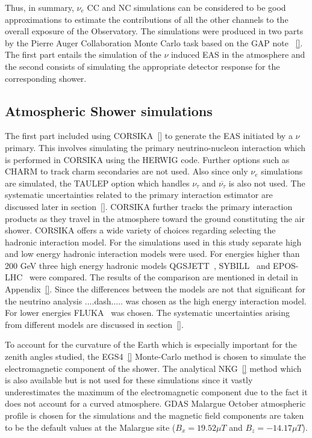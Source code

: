 Thus, in summary, $\nu_e$ CC and NC simulations can be considered to be good approximations to estimate the contributions of all the other channels to the overall exposure of the Observatory. The simulations were produced in two parts by the Pierre Auger Collaboration Monte Carlo task based on the GAP note ~\ref{}. The first part entails the simulation of the $\nu$ induced EAS in the atmosphere and the second consists of simulating the appropriate detector response for the corresponding shower. 

\subsection{Atmospheric Shower simulations}
\label{subsec:sim_EAS}
The first part included using CORSIKA~\ref{} to generate the EAS initiated by a $\nu$ primary. This involves simulating the primary neutrino-nucleon interaction which is performed in CORSIKA using the HERWIG code. Further options such as CHARM to track charm secondaries are not used. Also since only $\nu_e$ simulations are simulated, the TAULEP option which handles $\nu_{\tau}$ and $\overline{\nu_{\tau}}$ is also not used. The systematic uncertainties related to the primary interaction estimator are discussed later in section~\ref{}. CORSIKA further tracks the primary interaction products as they travel in the atmosphere toward the ground constituting the air shower. CORSIKA offers a wide variety of choices regarding selecting the hadronic interaction model. For the simulations used in this study separate high and low energy hadronic interaction models were used. For energies higher than 200 GeV three high energy hadronic models QGSJETT~\cite{}, SYBILL~\cite{} and EPOS-LHC~\cite{} were compared. The results of the comparison are mentioned in detail in Appendix~\ref{}. Since the differences between the models are not that significant for the neutrino analysis ....dash..... was chosen as the high energy interaction model. For lower energies FLUKA~\cite{} was chosen. The systematic uncertainties arising from different models are discussed in section~\ref{}.  

To account for the curvature of the Earth which is especially important for the zenith angles studied, the EGS4~\ref{} Monte-Carlo method is chosen to simulate the electromagnetic component of the shower. The analytical NKG~\ref{} method which is also available but is not used for these simulations since it vastly underestimates the maximum of the electromagnetic component due to the fact it does not account for a curved atmosphere. GDAS Malargue October atmospheric profile is chosen for the simulations and the magnetic field components are taken to be the default values at the Malargue site ($B_x = 19.52\mu T$ and $B_z = -14.17\mu T$). 

